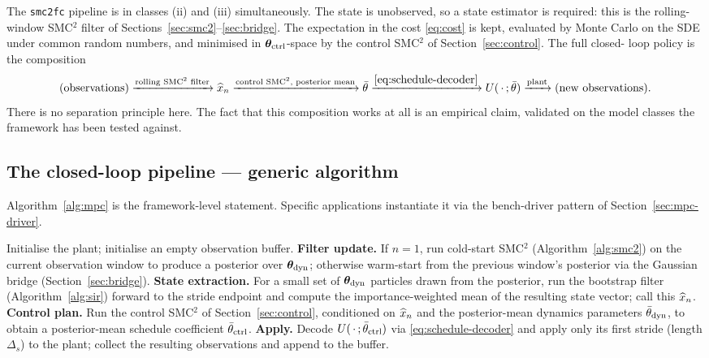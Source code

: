 The \texttt{smc2fc} pipeline is in classes (ii) and (iii)
simultaneously. The state is unobserved, so a state estimator is
required: this is the rolling-window SMC$^2$ filter of
Sections~\ref{sec:smc2}--\ref{sec:bridge}. The expectation in the
cost \eqref{eq:cost} is kept, evaluated by Monte Carlo on the SDE
under common random numbers, and minimised in $\bm{\theta}_{\rm ctrl}$-space by
the control SMC$^2$ of Section~\ref{sec:control}. The full closed-
loop policy is the composition
\[
\text{(observations)}
   \xrightarrow{\text{rolling SMC$^2$ filter}} \widehat{x}_n
   \xrightarrow{\text{control SMC$^2$, posterior mean}} \bar\theta
   \xrightarrow{\eqref{eq:schedule-decoder}} U(\,\cdot\,; \bar\theta)
   \xrightarrow{\text{plant}} \text{(new observations)}.
\]
There is no separation principle here. The fact that this composition
works at all is an empirical claim, validated on the model classes
the framework has been tested against.

\subsection{The closed-loop pipeline --- generic algorithm}
\label{sec:mpc-pipeline}

Algorithm~\ref{alg:mpc} is the framework-level statement. Specific
applications instantiate it via the bench-driver pattern of
Section~\ref{sec:mpc-driver}.

\begin{algorithm}[H]
\caption{\texttt{smc2fc} closed-loop MPC (generic)}
\label{alg:mpc}
\begin{algorithmic}[1]
\State Initialise the plant; initialise an empty observation buffer.
  \State \textbf{Filter update.} If $n = 1$, run cold-start SMC$^2$
         (Algorithm~\ref{alg:smc2}) on the current observation window
         to produce a posterior over $\bm{\theta}_{\rm dyn}$; otherwise warm-start
         from the previous window's posterior via the Gaussian bridge
         (Section~\ref{sec:bridge}).
  \State \textbf{State extraction.} For a small set of $\bm{\theta}_{\rm dyn}$
         particles drawn from the posterior, run the bootstrap filter
         (Algorithm~\ref{alg:sir}) forward to the stride endpoint and
         compute the importance-weighted mean of the resulting state
         vector; call this $\widehat{x}_n$.
  \State \textbf{Control plan.} Run the control SMC$^2$ of
         Section~\ref{sec:control}, conditioned on $\widehat{x}_n$ and the
         posterior-mean dynamics parameters $\bar\theta_{\rm dyn}$,
         to obtain a posterior-mean schedule coefficient
         $\bar\theta_{\rm ctrl}$.
  \State \textbf{Apply.} Decode
         $U(\,\cdot\,; \bar\theta_{\rm ctrl})$ via
         \eqref{eq:schedule-decoder} and apply only its first stride
         (length $\Delta_s$) to the plant; collect the resulting
         observations and append to the buffer.
\EndFor
\end{algorithmic}
\end{algorithm}

